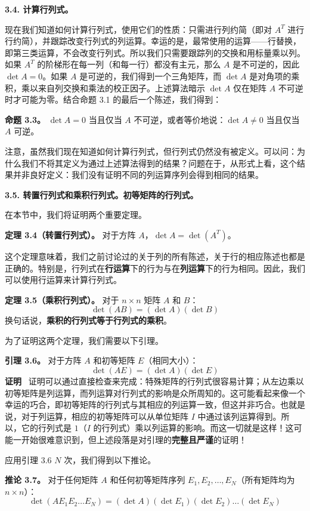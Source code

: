 \textbf{3.4. 计算行列式。}

现在我们知道如何计算行列式，使用它们的性质：只需进行列约简（即对 $A^T$ 进行行约简），并跟踪改变行列式的列运算。幸运的是，最常使用的运算——行替换，即第三类运算，不会改变行列式。所以我们只需要跟踪列的交换和用标量乘以列。如果 $A^T$ 的阶梯形在每一列（和每一行）都没有主元，那么 $A$ 是不可逆的，因此 $\det A = 0$。如果 $A$ 是可逆的，我们得到一个三角矩阵，而 $\det A$ 是对角项的乘积，乘以来自列交换和乘法的校正因子。上述算法暗示 $\det A$ 仅在矩阵 $A$ 不可逆时才可能为零。结合命题 3.1 的最后一个陈述，我们得到：

\textbf{命题 3.3。} $\det A = 0$ 当且仅当 $A$ 不可逆，或者等价地说：$\det A \neq 0$ 当且仅当 $A$ 可逆。

注意，虽然我们现在知道如何计算行列式，但行列式仍然没有被定义。可以问：为什么我们不将其定义为通过上述算法得到的结果？问题在于，从形式上看，这个结果并非良好定义：我们没有证明不同的列运算序列会得到相同的结果。

\textbf{3.5. 转置行列式和乘积行列式。初等矩阵的行列式。}

在本节中，我们将证明两个重要定理。

\textbf{定理 3.4（转置行列式）。} 对于方阵 $A$，$\det A = \det(A^T)$。

这个定理意味着，我们之前讨论过的关于列的所有陈述，关于行的相应陈述也都是正确的。特别是，行列式在\textbf{行运算}下的行为与在\textbf{列运算}下的行为相同。因此，我们可以使用行运算来计算行列式。

\textbf{定理 3.5（乘积行列式）。} 对于 $n \times n$ 矩阵 $A$ 和 $B$：
$$
\det(AB) = (\det A)(\det B)
$$
换句话说，\textbf{乘积的行列式等于行列式的乘积}。

为了证明这两个定理，我们需要以下引理。

\textbf{引理 3.6。} 对于方阵 $A$ 和初等矩阵 $E$（相同大小）：
$$
\det(AE) = (\det A)(\det E)
$$
\textbf{证明}~ 证明可以通过直接检查来完成：特殊矩阵的行列式很容易计算；从左边乘以初等矩阵是列运算，而列运算对行列式的影响是众所周知的。这可能看起来像一个幸运的巧合，即初等矩阵的行列式与其相应的列运算一致，但这并非巧合。也就是说，对于列运算，相应的初等矩阵可以从单位矩阵 $I$ 中通过该列运算得到。所以，它的行列式是 $1$（$I$ 的行列式）乘以列运算的影响。而这一切就是这样！这可能一开始很难意识到，但上述段落是对引理的\textbf{完整且严谨}的证明！

应用引理 3.6 $N$ 次，我们得到以下推论。

\textbf{推论 3.7。} 对于任何矩阵 $A$ 和任何初等矩阵序列 $E_1, E_2, \dots, E_N$（所有矩阵均为 $n \times n$）：
$$
\det(A E_1 E_2 \dots E_N) = (\det A)(\det E_1)(\det E_2) \dots (\det E_N)
$$

